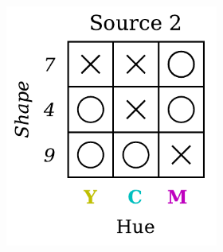 \begin{definition}
\begin{figure}[H]
\begin{subfigure}[b]{0.45\textwidth}
\begin{subfigure}[b]{0.48\textwidth}
                \includegraphics[width=\textwidth]{img/datasets/1-CGO_fact=hue_env=1.pdf}
            \end{subfigure}
        \end{subfigure}
        \hfill
        \begin{subfigure}[b]{0.45\textwidth}
            \centering
            \begin{subfigure}[b]{0.48\textwidth}
                \centering

\end{subfigure}
\end{subfigure}
\end{figure}
\end{definition}
